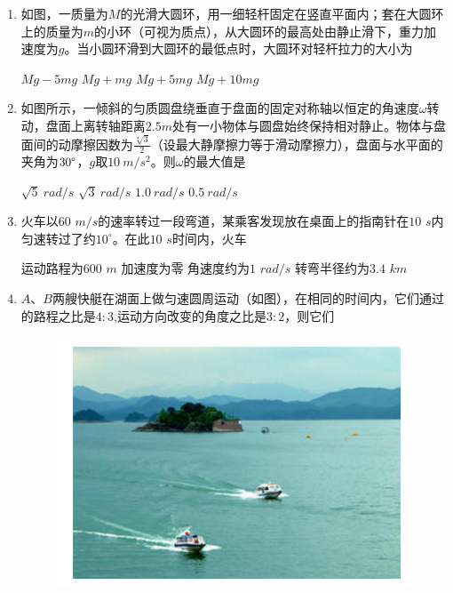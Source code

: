 \begin{enumerate}[leftmargin=0em]
\item 
{}
如图，一质量为$ M $的光滑大圆环，用一细轻杆固定在竖直平面内；套在大圆环上的质量为$ m $的小环（可视为质点），从大圆环的最高处由静止滑下，重力加速度为$ g $。当小圆环滑到大圆环的最低点时，大圆环对轻杆拉力的大小为  
\begin{figure}[h!]
\centering

\end{figure}

\fourchoices
{$ Mg-5mg $ }
{$ Mg+mg $}
{$ Mg+5mg $ }
{$ Mg+10mg $}



\item 
{}
如图所示，一倾斜的匀质圆盘绕垂直于盘面的固定对称轴以恒定的角速度$ \omega $转动，盘面上离转轴距离$ 2.5m $处有一小物体与圆盘始终保持相对静止。物体与盘面间的动摩擦因数为$ \frac{\sqrt[4]{3}}{2} $（设最大静摩擦力等于滑动摩擦力），盘面与水平面的夹角为$ 30 \degree $，$ g $取$ 10 \ m/s^{2} $。则$ \omega $的最大值是  

\begin{figure}[h!]
\centering

\end{figure}

\fourchoices
{$ \sqrt{5}\ rad/s $ }
{$ \sqrt{3}\ rad/s $}
{$ 1.0 \ rad/s $ }
{$ 0.5 \ rad/s $}



\item 
{}
火车以$ 60 $ $ m/s $的速率转过一段弯道，某乘客发现放在桌面上的指南针在$ 10 $ $ s $内匀速转过了约$ 10 ^{ \circ } $。在此$ 10 $ $ s $时间内，火车  

\fourchoices
{运动路程为$ 600 $ $ m $ }
{加速度为零}
{角速度约为$ 1 $ $ rad/s $ }
{转弯半径约为$ 3.4 $ $ km $}



\item 
{}
$ A $、$ B $两艘快艇在湖面上做匀速圆周运动（如图），在相同的时间内，它们通过的路程之比是$ 4:3 $,运动方向改变的角度之比是$ 3:2 $，则它们  
\begin{figure}[h!]
\centering
\includegraphics[width=0.3\linewidth]{picture/screenshot004}
\end{figure}


\end{enumerate}
